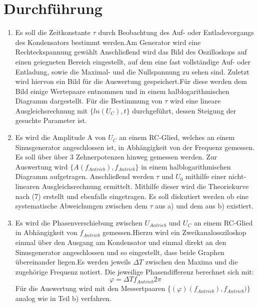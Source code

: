 \section{Durchführung}
\label{sec:Durchführung}
\renewcommand{\labelenumi}{\alph{enumi})}
\begin{enumerate}
  \item Es soll die Zeitkonstante $\tau$ durch Beobachtung des Auf- oder Entladevorgangs
  des Kondensators bestimmt werden.Am Generator wird eine Rechteckspannung gewählt
  Anschließend wird das Bild des Oszilloskops auf einen
  geiegneten Bereich eingestellt, auf dem eine fast vollständige Auf- oder Entladung, sowie
  die Maximal- und die Nullspannung zu sehen sind. Zuletzt wird hiervon ein Bild für die
  Auswertung gespeichert.Für diese werden dem Bild einige Wertepaare entnommen und in einem
  halblogarithmischen Diagramm dargestellt. Für die Bestimmung von $\tau$ wird eine
  lineare Ausgleichsrechnung mit $\{ln(U_C), t\}$ durchgeführt, dessen Steigung der gesuchte
  Parameter ist.

  \item Es wird die Amplitude A von $U_C$ an einem RC-Glied, welches an einem Sinusgenerator
   angeschlossen ist, in Abhängigkeit von der Frequenz gemessen. Es soll über über
   3 Zehnerpotenzen hinweg gemessen werden. Zur Auswertung wird $\{A(f_{Antrieb}), f_{Antrieb}\}$
   in einem halblogarithmischen Diagramm aufgetragen. Anschließend werden $\tau$ und $U_0$ mithilfe einer nicht-linearen
    Ausgleichsrechnung ermittelt. Mithilfe dieser wird die Theoriekurve nach (7) erstellt und
    ebenfalls eingetragen. Es soll diskutiert werden ob eine systematische Abweichungen
    zwischen dem $\tau$ aus a) und dem aus b) existiert.



    \item Es wird die Phasenverschiebung zwischen $U_{Antrieb}$ und $U_C$ an einem
    RC-Glied in Abhängigkeit von $f_{Antrieb}$ gemessen.Hierzu wird ein Zweikanalossziloskop
    einmal über den Ausgang am Kondensator und einmal direkt an den Sinusgenerator angeschlossen
     und so eingestellt, dass beide Graphen übereinander liegen.Es werden jeweils
      $\Delta T$ zwischen den Maxima und die zugehörige Frequenz notiert. Die jeweilige
       Phasendifferenz berechnet sich mit:
       \begin{equation}
         \varphi = \Delta Tf_{Antrieb} 2 \pi
       \end{equation}
       Für die Auswertung wird mit den Messertpaaren $\{(\varphi)(f_{Antrieb}),f_{Antrieb})\}$
       analog wie in Teil b) verfahren.


\end{enumerate}
